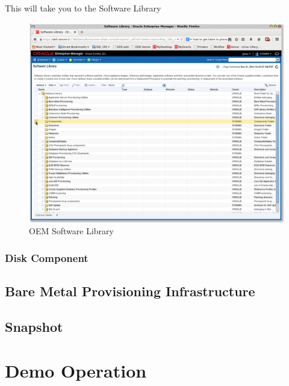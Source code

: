 \documentclass[11pt]{article}
\begin{document}
This will take you to the Software Library
\begin{figure}[htb]
\centering
\includegraphics[width=.9\linewidth]{./images/Software_Library_1.png}
\caption{OEM Software Library}
\end{figure}
\clearpage
\subsubsection{Disk Component}
\label{sec-4-3-2}
\subsection{Bare Metal Provisioning Infrastructure}
\label{sec-4-4}
\subsection{Snapshot}
\label{sec-4-5}
\section{Demo Operation}
\label{sec-5}
\end{document}
